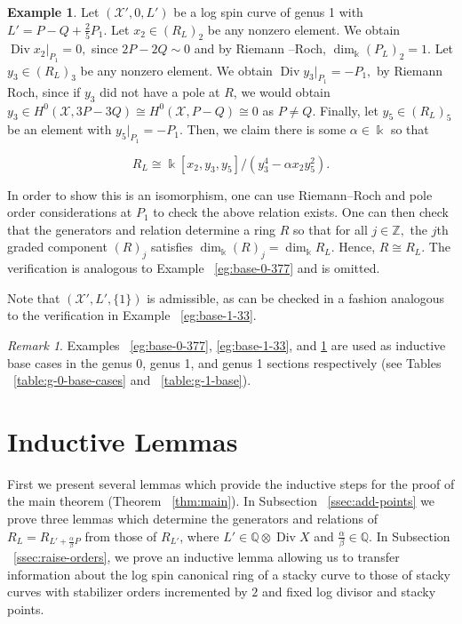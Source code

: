 \documentclass{amsart}
\theoremstyle{plain}
\theoremstyle{definition}
\newtheorem{example}[thm]{Example}
\theoremstyle{remark}
\newtheorem{rem}[thm]{Remark}
\numberwithin{equation}{section}
\newcommand\BQ{{\mathbb Q}}
\newcommand\BZ{{\mathbb Z}}
\newcommand\Bk{{\Bbbk}}
\DeclareMathOperator\di{Div}
\newcommand\sx{\mathscr X}
\newcommand{\halfcan}{L}
\begin{document}
\begin{example}
\label{eg:exception-1-5}
Let $(\sx', 0, L')$ be a log spin curve of genus 1 with $L' = P -
 Q + \frac{2}{5} P_1.$ Let $x_2 \in (R_L)_2$ be any nonzero element.
We obtain $\di x_2|_{P_1} = 0,$ since $2P - 2Q \sim 0$ and by Riemann
--Roch, $\dim_\Bk (P_L)_2 = 1.$ Let $y_3 \in (R_\halfcan)_3$ be any nonzero
element. We obtain $\di y_3|_{P_1} = - P_1,$ by Riemann Roch, since
if $y_3$ did not have a pole at $R$, we would obtain $y_3 \in H^0
(\sx,3P-3Q) \cong H^0(\sx, P - Q) \cong 0$ as $P \neq Q$. Finally,
let $y_5 \in (R_\halfcan)_5$ be an element with $y_5|_{P_1} = -P_1$. Then,
we claim there is some $\alpha \in \Bk$ so that

$$R_\halfcan \cong \Bk[x_2 , y_3, y_5]/(y_3^4 - \alpha x_2 y_5^2).$$

In order to show this is an isomorphism, one can use Riemann--Roch and pole order considerations at $P_1$ to check the above relation exists. One can then check that the generators and relation determine a ring $R$ so that for all $j \in \BZ,$ the $j$th graded component $(R)_j$ satisfies $\dim_\Bk (R)_j = \dim_\Bk R_\halfcan.$ Hence, $R \cong R_\halfcan$. The verification is analogous to Example ~\ref{eg:base-0-377} and is omitted.

Note that $(\sx', \halfcan', \{1\})$ is admissible, as can be checked in a fashion analogous to the verification in Example ~\ref{eg:base-1-33}.
\end{example}

\begin{rem}
\label{rem:base-0-377}
Examples ~\ref{eg:base-0-377}, \ref{eg:base-1-33}, and \ref{eg:exception-1-5} are used as inductive base cases in the genus 0, genus 1, and genus 1 sections respectively (see Tables ~\ref{table:g-0-base-cases} and ~\ref{table:g-1-base}).
\end{rem}



\section{Inductive Lemmas}
\label{sec:induction}
First we present several lemmas which provide the inductive steps
for the proof of the main theorem (Theorem ~\ref{thm:main}). In
Subsection ~\ref{ssec:add-points} we prove three lemmas which
determine the generators and relations of $R_\halfcan = R_{\halfcan'
+ \frac{\alpha }{\beta}P}$ from those of $R_{\halfcan'}$, where
$\halfcan' \in \BQ \otimes \di X$ and $\frac{\alpha}{\beta} \in \BQ$. 
In Subsection ~\ref{ssec:raise-orders}, we prove an inductive lemma
allowing us to transfer information about the log spin canonical 
ring of a stacky curve to those of stacky curves with stabilizer
orders incremented by $2$ and fixed log divisor and stacky points.
\end{document}
